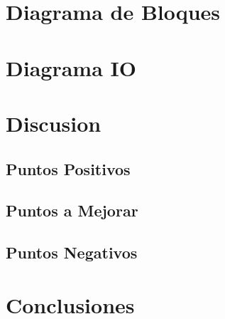 \documentclass[letter]{article}
\begin{document}
\begin{pregunta}{1}
    \section{Diagrama de Bloques}
    \section{Diagrama IO}
    \section{Discusion}
        \subsection{Puntos Positivos}
        \subsection{Puntos  a Mejorar}
        \subsection{Puntos Negativos}
    \section{Conclusiones}
\end{pregunta}
\end{document}
